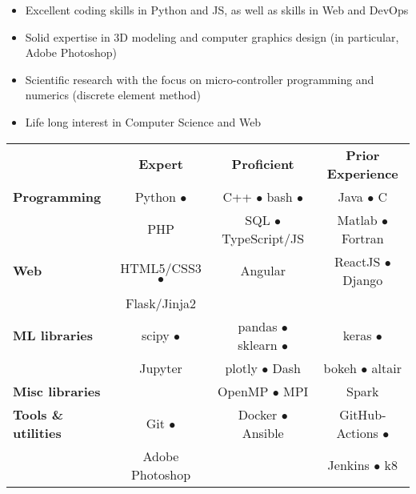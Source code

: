 \documentclass[
  a4paper
]{../FortySecondsCV/fortysecondscv}
\begin{document}
\makefrontsidebar


\begin{itemize}[leftmargin=*]\setlength\itemsep{-.5em}
\item Excellent coding skills in Python and JS, as well as skills in Web and DevOps
\item Solid expertise in 3D modeling and computer graphics design (in particular, Adobe Photoshop)
\item Scientific research with the focus on micro-controller programming and numerics (discrete element method)
\item Life long interest in Computer Science and Web
\end{itemize}


\setlength{\tabcolsep}{.5em}
\begin{tabular}{ l c  c  c }
  & \textcolor{black!50}{\textbf{Expert}}
  & \textcolor{black!50}{\textbf{Proficient}} %
  & \textcolor{black!50}{\textbf{Prior Experience}} \\
  \textbf{Programming} & Python $\bullet$ & C++ $\bullet$ bash $\bullet$ & Java $\bullet$ C \\
  & PHP & SQL $\bullet$ TypeScript/JS & Matlab $\bullet$ Fortran \\
  \textbf{Web} & HTML5/CSS3 $\bullet$ & Angular & ReactJS $\bullet$ Django \\
  & Flask/Jinja2 & &  \\
  \textbf{ML libraries} & scipy $\bullet$ & pandas $\bullet$ sklearn $\bullet$ & keras $\bullet$ \\
  & Jupyter & plotly $\bullet$ Dash &  bokeh $\bullet$ altair \\
  \textbf{Misc libraries} &  & OpenMP $\bullet$ MPI & Spark \\
  \textbf{Tools \& utilities} & Git $\bullet$ & Docker $\bullet$ Ansible & GitHub-Actions $\bullet$  \\
  & Adobe Photoshop &  & Jenkins $\bullet$ k8 \\
\end{tabular}
\setlength{\tabcolsep}{0em}

\graphicspath{{../FortySecondsCV/pics/gosquared-flags/flags/flags-iso/shiny/64/}}

\end{document}
